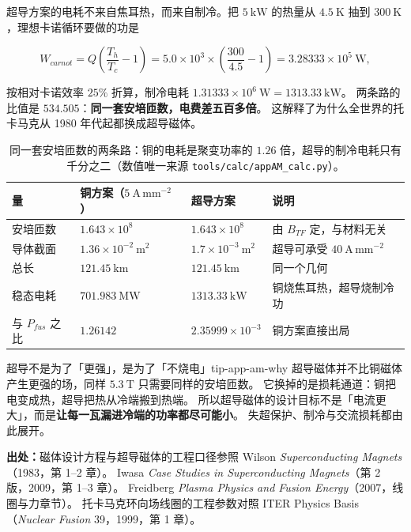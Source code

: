 超导方案的电耗不来自焦耳热，而来自制冷。把 $5\ \mathrm{kW}$ 的热量从
$4.5\ \mathrm{K}$ 抽到 $300\ \mathrm{K}$，理想卡诺循环要做的功是

\begin{equation}
W_{carnot}=Q\left(\frac{T_{h}}{T_{c}}-1\right)
=5.0\times10^{3}\times\left(\frac{300}{4.5}-1\right)
=3.28333\times10^{5}\ \mathrm{W},
\label{eq:app-am-carnot}
\end{equation}

按相对卡诺效率 $25\%$ 折算，制冷电耗 $1.31333\times10^{6}\ \mathrm{W}=1313.33\ \mathrm{kW}$。
两条路的比值是 $534.505$：\textbf{同一套安培匝数，电费差五百多倍}。
这解释了为什么全世界的托卡马克从 1980 年代起都换成超导磁体。

\begin{table}[htbp]
\centering
\small
\caption{同一套安培匝数的两条路：铜的电耗是聚变功率的 $1.26$ 倍，超导的制冷电耗只有千分之二（数值唯一来源 \texttt{tools/\allowbreak{}calc/\allowbreak{}appAM\_calc.py}）。}
\label{tab:app-am-sc}
\begin{tabular}{p{3.5cm}p{3.6cm}p{3.4cm}p{3.6cm}}
\toprule
量 & 铜方案（$5\ \mathrm{A\,mm^{-2}}$） & 超导方案 & 说明 \\
\midrule
安培匝数 & $1.643\times10^{8}$ & $1.643\times10^{8}$ & 由 $B_{TF}$ 定，与材料无关 \\
导体截面 & $1.36\times10^{-2}\ \mathrm{m^{2}}$ & $1.7\times10^{-3}\ \mathrm{m^{2}}$ & 超导可承受 $40\ \mathrm{A\,mm^{-2}}$ \\
总长 & $121.45\ \mathrm{km}$ & $121.45\ \mathrm{km}$ & 同一个几何 \\
稳态电耗 & $701.983\ \mathrm{MW}$ & $1313.33\ \mathrm{kW}$ & 铜烧焦耳热，超导烧制冷功 \\
与 $P_{fus}$ 之比 & $1.26142$ & $2.35999\times10^{-3}$ & 铜方案直接出局 \\
\bottomrule
\end{tabular}

\end{table}

\begin{tip}{超导不是为了「更强」，是为了「不烧电」}{tip-app-am-why}
超导磁体并不比铜磁体产生更强的场，同样 $5.3\ \mathrm{T}$ 只需要同样的安培匝数。
它换掉的是损耗通道：铜把电变成热，超导把热从冷端搬到热端。
所以超导磁体的设计目标不是「电流更大」，而是\textbf{让每一瓦漏进冷端的功率都尽可能小}。
失超保护、制冷与交流损耗都由此展开。
\end{tip}

{\footnotesize
\textbf{出处：}磁体设计方程与超导磁体的工程口径参照 Wilson \emph{Superconducting Magnets}（1983，第 1--2 章）。
Iwasa \emph{Case Studies in Superconducting Magnets}（第 2 版，2009，第 1--3 章）。
Freidberg \emph{Plasma Physics and Fusion Energy}（2007，线圈与力章节）。
托卡马克环向场线圈的工程参数对照 ITER Physics Basis（\emph{Nuclear Fusion} 39，1999，第 1 章）。
}

